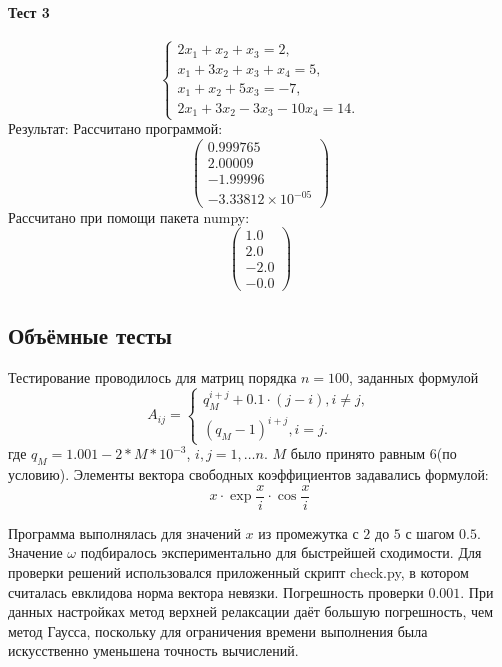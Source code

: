 \paragraph{Тест 3}
\begin{equation*}
    \begin{cases}
    2x_1 + x_2 + x_3 = 2, \\
    x_1 + 3x_2 + x_3 + x_4 = 5, \\
    x_1 + x_2 + 5x_3 = -7, \\
    2x_1 + 3x_2 - 3x_3 - 10x_4 = 14.
    \end{cases}
\end{equation*}
Результат:
Рассчитано программой:
\begin{equation*}
    \begin{pmatrix}
        0.999765 \\
        2.00009 \\
        -1.99996 \\
        -3.33812 \times 10^{-05}
    \end{pmatrix}
\end{equation*}
Рассчитано при помощи пакета numpy:
\begin{equation*}
    \begin{pmatrix}
        1.0 \\
        2.0 \\
        -2.0 \\
        -0.0
    \end{pmatrix}
\end{equation*}

\newpage
\subsection{Объёмные тесты}

Тестирование проводилось для матриц порядка $n = 100$, заданных формулой
\begin{equation*}
A_{ij} = 
    \begin{cases}
        q_M^{i + j} + 0.1 \cdot (j - i), i \ne j, \\
        \left(q_M - 1\right)^{i + j}, i = j.
    \end{cases}
\end{equation*}
где $q_M = 1.001 - 2 * M * 10^{-3}$, $ i, j = 1, \ldots n$.
$M$ было принято равным 6(по условию).
Элементы вектора свободных коэффициентов задавались формулой:
$$
    x \cdot \exp{\frac{x}{i}} \cdot \cos{\frac{x}{i}}
$$

Программа выполнялась для значений $x$ из промежутка с $2$ до $5$ с шагом $0.5$.
Значение $\omega$ подбиралось экспериментально для быстрейшей сходимости.
Для проверки решений использовался приложенный скрипт check.py, в котором считалась евклидова норма вектора невязки.
Погрешность проверки $0.001$.
При данных настройках метод верхней релаксации даёт большую погрешность, чем метод Гаусса, поскольку для ограничения 
времени выполнения была искусственно уменьшена точность вычислений.

